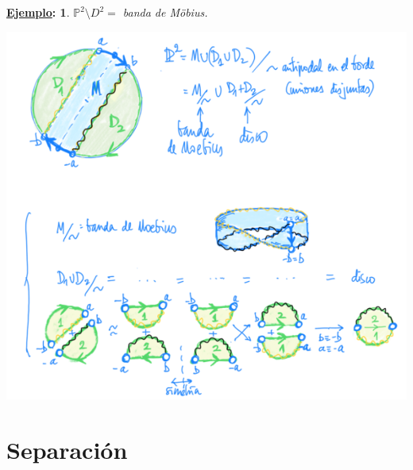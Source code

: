 \documentclass[10pt,a4paper,openright]{book}
\theoremstyle{break}
\newtheorem*{ej}{\underline{Ejemplo}:}
\begin{document}
\begin{ej}
$\mathbb{P}^{2} \setminus D^2 = $ banda de Möbius.
\begin{center}
    \includegraphics[scale=0.3]{images/banda_moebius} 
\end{center}
\end{ej}


\chapter{Separación}%
\label{cha:separacion}
\end{document}
